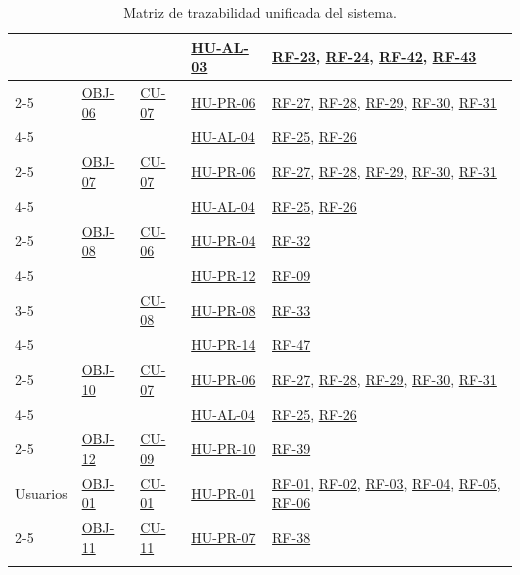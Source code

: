 \begin{table}[H]
{\begin{tabular}{llllp{7cm}}
          &                           &                           & \hyperref[hu:al-03]{HU-AL-03} & \hyperref[req:23]{RF-23}, \hyperref[req:24]{RF-24}, \hyperref[req:42]{RF-42}, \hyperref[req:43]{RF-43} \\ \cline{2-5} 
          & \hyperref[obj:06]{OBJ-06} & \hyperref[cu:07]{CU-07} & \hyperref[hu:pr-06]{HU-PR-06} & \hyperref[req:27]{RF-27}, \hyperref[req:28]{RF-28}, \hyperref[req:29]{RF-29}, \hyperref[req:30]{RF-30}, \hyperref[req:31]{RF-31} \\ \cline{4-5} 
          &                           &                           & \hyperref[hu:al-04]{HU-AL-04} & \hyperref[req:25]{RF-25}, \hyperref[req:26]{RF-26} \\ \cline{2-5} 
          & \hyperref[obj:07]{OBJ-07} & \hyperref[cu:07]{CU-07} & \hyperref[hu:pr-06]{HU-PR-06} & \hyperref[req:27]{RF-27}, \hyperref[req:28]{RF-28}, \hyperref[req:29]{RF-29}, \hyperref[req:30]{RF-30}, \hyperref[req:31]{RF-31} \\ \cline{4-5} 
          &                           &                           & \hyperref[hu:al-04]{HU-AL-04} & \hyperref[req:25]{RF-25}, \hyperref[req:26]{RF-26} \\ \cline{2-5} 
          & \hyperref[obj:08]{OBJ-08} & \hyperref[cu:06]{CU-06} & \hyperref[hu:pr-04]{HU-PR-04} & \hyperref[req:32]{RF-32} \\ \cline{4-5} 
          &                           &                           & \hyperref[hu:pr-12]{HU-PR-12} & \hyperref[req:09]{RF-09} \\ \cline{3-5} 
          &                           & \hyperref[cu:08]{CU-08} & \hyperref[hu:pr-08]{HU-PR-08} & \hyperref[req:33]{RF-33} \\ \cline{4-5} 
          &                           &                           & \hyperref[hu:pr-14]{HU-PR-14} & \hyperref[req:47]{RF-47} \\ \cline{2-5} 
          & \hyperref[obj:10]{OBJ-10} & \hyperref[cu:07]{CU-07} & \hyperref[hu:pr-06]{HU-PR-06} & \hyperref[req:27]{RF-27}, \hyperref[req:28]{RF-28}, \hyperref[req:29]{RF-29}, \hyperref[req:30]{RF-30}, \hyperref[req:31]{RF-31} \\ \cline{4-5} 
          &                           &                           & \hyperref[hu:al-04]{HU-AL-04} & \hyperref[req:25]{RF-25}, \hyperref[req:26]{RF-26} \\ \cline{2-5} 
          & \hyperref[obj:12]{OBJ-12} & \hyperref[cu:09]{CU-09} & \hyperref[hu:pr-10]{HU-PR-10} & \hyperref[req:39]{RF-39} \\ \hline
Usuarios  & \hyperref[obj:01]{OBJ-01} & \hyperref[cu:01]{CU-01} & \hyperref[hu:pr-01]{HU-PR-01} & \hyperref[req:01]{RF-01}, \hyperref[req:02]{RF-02}, \hyperref[req:03]{RF-03}, \hyperref[req:04]{RF-04}, \hyperref[req:05]{RF-05}, \hyperref[req:06]{RF-06} \\ \cline{2-5} 
          & \hyperref[obj:11]{OBJ-11} & \hyperref[cu:11]{CU-11} & \hyperref[hu:pr-07]{HU-PR-07} & \hyperref[req:38]{RF-38} \\ \bighline
\end{tabular}
}
\caption{Matriz de trazabilidad unificada del sistema.}
\label{tab:matriz_trazabilidad}
\end{table}
